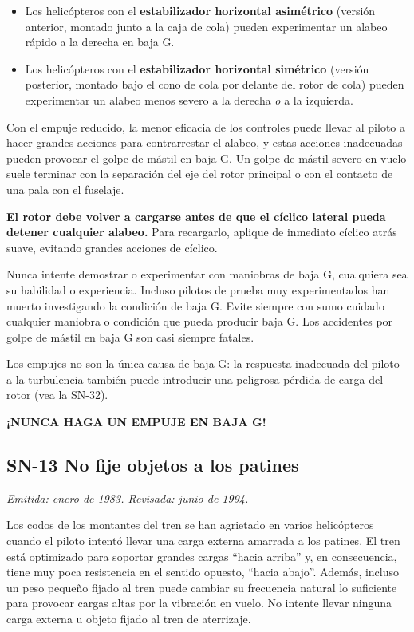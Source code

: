 \begin{itemize}
\item Los helicópteros con el \textbf{estabilizador horizontal asimétrico} (versión anterior, montado junto a la caja de cola) pueden experimentar un alabeo rápido a la derecha en baja G.
\item Los helicópteros con el \textbf{estabilizador horizontal simétrico} (versión posterior, montado bajo el cono de cola por delante del rotor de cola) pueden experimentar un alabeo menos severo a la derecha \emph{o} a la izquierda.
\end{itemize}

Con el empuje reducido, la menor eficacia de los controles puede llevar al piloto a hacer grandes acciones para contrarrestar el alabeo, y estas acciones inadecuadas pueden provocar el golpe de mástil en baja G. Un golpe de mástil severo en vuelo suele terminar con la separación del eje del rotor principal o con el contacto de una pala con el fuselaje.

\textbf{El rotor debe volver a cargarse antes de que el cíclico lateral pueda detener cualquier alabeo.} Para recargarlo, aplique de inmediato cíclico atrás suave, evitando grandes acciones de cíclico.

Nunca intente demostrar o experimentar con maniobras de baja G, cualquiera sea su habilidad o experiencia. Incluso pilotos de prueba muy experimentados han muerto investigando la condición de baja G. Evite siempre con sumo cuidado cualquier maniobra o condición que pueda producir baja G. Los accidentes por golpe de mástil en baja G son casi siempre fatales.

Los empujes no son la única causa de baja G: la respuesta inadecuada del piloto a la turbulencia también puede introducir una peligrosa pérdida de carga del rotor (vea la SN-32).

\begin{center}\textbf{¡NUNCA HAGA UN EMPUJE EN BAJA G!}\end{center}

\subsection*{SN-13 \quad No fije objetos a los patines}
{\small\textit{Emitida: enero de 1983. Revisada: junio de 1994.}}

Los codos de los montantes del tren se han agrietado en varios helicópteros cuando el piloto intentó llevar una carga externa amarrada a los patines. El tren está optimizado para soportar grandes cargas ``hacia arriba'' y, en consecuencia, tiene muy poca resistencia en el sentido opuesto, ``hacia abajo''. Además, incluso un peso pequeño fijado al tren puede cambiar su frecuencia natural lo suficiente para provocar cargas altas por la vibración en vuelo. No intente llevar ninguna carga externa u objeto fijado al tren de aterrizaje.

